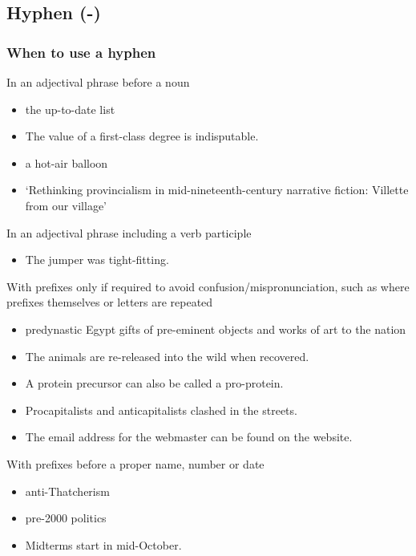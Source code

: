 \documentclass[11pt,a4paper]{book}
\newcommand{\cmark}{{\color{green(html/cssgreen)}\checkmark}}%
\begin{document}
		\subsection{Hyphen (-)}
			\subsubsection{When to use a hyphen}
			In an adjectival phrase before a noun
			{\firasans \begin{mdframed}[backgroundcolor=aliceblue] \begin{itemize}[label=\cmark]
				\item the up-to-date list
				\item The value of a first-class degree is indisputable.
				\item a hot-air balloon
				\item `Rethinking provincialism in mid-nineteenth-century narrative fiction: Villette from our village'
			\end{itemize} \end{mdframed} }
		In an adjectival phrase including a verb participle
		{\firasans \begin{mdframed}[backgroundcolor=aliceblue] \begin{itemize}[label=\cmark]
			\item The jumper was tight-fitting.
		\end{itemize} \end{mdframed} }
		With prefixes only if required to avoid confusion/mispronunciation, such as where prefixes themselves or letters are repeated
		{\firasans \begin{mdframed}[backgroundcolor=aliceblue] \begin{itemize}[label=\cmark]
			\item predynastic Egypt
			gifts of pre-eminent objects and works of art to the nation
			\item The animals are re-released into the wild when recovered.
			\item A protein precursor can also be called a pro-protein.
			\item Procapitalists and anticapitalists clashed in the streets.
			\item The email address for the webmaster can be found on the website.
		\end{itemize} \end{mdframed} }
		With prefixes before a proper name, number or date
		{\firasans \begin{mdframed}[backgroundcolor=aliceblue] \begin{itemize}[label=\cmark]
			\item anti-Thatcherism
			\item pre-2000 politics
			\item Midterms start in mid-October.
		\end{itemize} \end{mdframed} }
\end{document}
